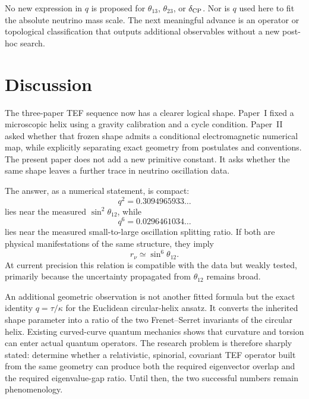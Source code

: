 \documentclass[10pt,twocolumn]{article}
\newcommand{\rnu}{r_{\nu}}
\begin{document}
No new expression in $q$ is proposed for
$\theta_{13}$, $\theta_{23}$, or $\delta_{\rm CP}$.  Nor is $q$ used here to fit
the absolute neutrino mass scale.  The next meaningful advance is an operator or
topological classification that outputs additional observables without a new
post-hoc search.

\section{Discussion}

The three-paper TEF sequence now has a clearer logical shape.  Paper~I fixed a
microscopic helix using a gravity calibration and a cycle condition.  Paper~II
asked whether that frozen shape admits a conditional electromagnetic numerical
map, while explicitly separating exact geometry from postulates and conventions.
The present paper does not add a new primitive constant.  It asks whether the same
shape leaves a further trace in neutrino oscillation data.

The answer, as a numerical statement, is compact:
\begin{equation}
q^2=0.3094965933\ldots
\end{equation}
lies near the measured $\sin^2\theta_{12}$, while
\begin{equation}
q^6=0.0296461034\ldots
\end{equation}
lies near the measured small-to-large oscillation splitting ratio.  If both are
physical manifestations of the same structure, they imply
\begin{equation}
\rnu\simeq\sin^6\theta_{12}.
\end{equation}
At current precision this relation is compatible with the data but weakly tested,
primarily because the uncertainty propagated from $\theta_{12}$ remains broad.

An additional geometric observation is not another fitted formula but the exact
identity $q=\tau/\kappa$ for the Euclidean circular-helix ansatz.  It converts the inherited shape parameter into a ratio
of the two Frenet--Serret invariants of the circular helix.  Existing curved-curve
quantum mechanics shows that curvature and torsion can enter actual quantum
operators.  The research problem is therefore sharply stated: determine whether a
relativistic, spinorial, covariant TEF operator built from the same geometry can
produce both the required eigenvector overlap and the required eigenvalue-gap
ratio.  Until then, the two successful numbers remain phenomenology.
\end{document}
